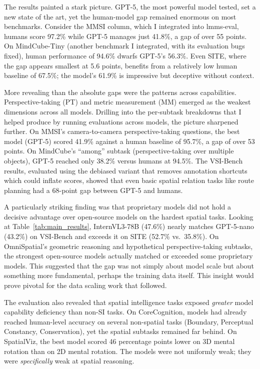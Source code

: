 The results painted a stark picture. GPT-5, the most powerful model tested, set a new state of the art, yet the human-model gap remained enormous on most benchmarks. Consider the MMSI column, which I integrated into lmms-eval, humans score 97.2\% while GPT-5 manages just 41.8\%, a gap of over 55 points. On MindCube-Tiny (another benchmark I integrated, with its evaluation bugs fixed), human performance of 94.6\% dwarfs GPT-5's 56.3\%. Even SITE, where the gap appears smallest at 5.6 points, benefits from a relatively low human baseline of 67.5\%; the model's 61.9\% is impressive but deceptive without context.

More revealing than the absolute gaps were the patterns across capabilities. Perspective-taking (PT) and metric measurement (MM) emerged as the weakest dimensions across all models. Drilling into the per-subtask breakdowns that I helped produce by running evaluations across models, the picture sharpened further. On MMSI's camera-to-camera perspective-taking questions, the best model (GPT-5) scored 41.9\% against a human baseline of 95.7\%, a gap of over 53 points. On MindCube's ``among'' subtask (perspective-taking over multiple objects), GPT-5 reached only 38.2\% versus humans at 94.5\%. The VSI-Bench results, evaluated using the debiased variant that removes annotation shortcuts which could inflate scores, showed that even basic spatial relation tasks like route planning had a 68-point gap between GPT-5 and humans.

A particularly striking finding was that proprietary models did not hold a decisive advantage over open-source models on the hardest spatial tasks. Looking at Table~\ref{tab:main_results}, InternVL3-78B (47.6\%) nearly matches GPT-5-nano (43.2\%) on VSI-Bench and exceeds it on SITE (52.7\% vs.\ 35.8\%). On OmniSpatial's geometric reasoning and hypothetical perspective-taking subtasks, the strongest open-source models actually matched or exceeded some proprietary models. This suggested that the gap was not simply about model scale but about something more fundamental, perhaps the training data itself. This insight would prove pivotal for the data scaling work that followed.

The evaluation also revealed that spatial intelligence tasks exposed \textit{greater} model capability deficiency than non-SI tasks. On CoreCognition, models had already reached human-level accuracy on several non-spatial tasks (Boundary, Perceptual Constancy, Conservation), yet the spatial subtasks remained far behind. On SpatialViz, the best model scored 46 percentage points lower on 3D mental rotation than on 2D mental rotation. The models were not uniformly weak; they were \textit{specifically} weak at spatial reasoning.

